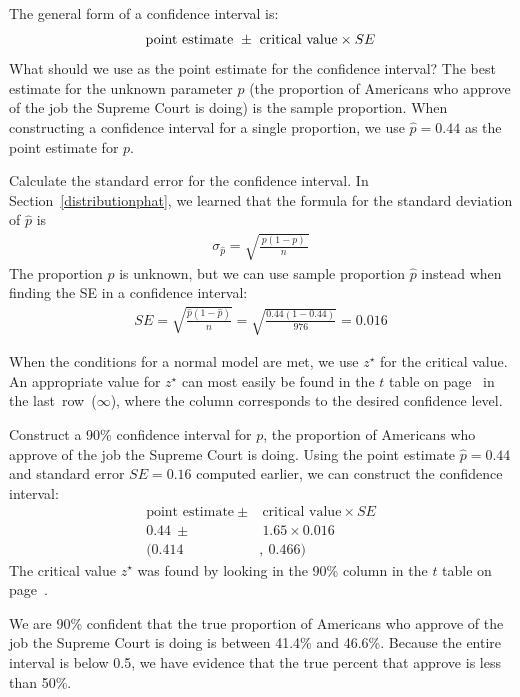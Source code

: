 \begin{example}{The general form of a confidence interval is:
\begin{align*}
\text{point estimate}\ \pm\ \text{critical value} \times SE\vspace{-2mm}
\end{align*}
What should we use as the point estimate for the confidence interval?}
\label{supremeCourtCISEExample}
The best estimate for the unknown parameter $p$ (the proportion of Americans who approve of the job the Supreme Court is doing) is the sample proportion. When constructing a confidence interval for a single proportion, we use $\hat{p} = 0.44$ as the point estimate for $p$.
\end{example}

\begin{example}{Calculate the standard error for the confidence interval.}
\label{supremeCourtCIFinishedExample}
In Section~\ref{distributionphat}, we learned that the formula for the standard deviation of $\hat{p}$ is
\begin{align*}
\sigma_{\hat{p}} = \sqrt{\frac{\ p(1-p)\ }{n}}
\end{align*}
The proportion $p$ is unknown, but we can use sample proportion $\hat{p}$ instead when finding the SE in a confidence interval:
\begin{align*}
SE = \sqrt{\frac{\hat{p}(1-\hat{p})}{n}}= \sqrt{\frac{0.44(1-0.44)}{976}}= 0.016
\end{align*}
\end{example}

When the conditions for a normal model are met, we use $z^\star$ for the critical value. An appropriate value for $z^\star$ can most easily be found in the $t$ table on page~\pageref{tDistributionTable} in the last~row~($\infty$), where the column corresponds to the desired confidence level.

\begin{example}{Construct a 90\% confidence interval for $p$, the proportion of Americans who approve of the job the Supreme Court is doing.}\label{90CIForJobSupremeCourtDoingExample}
Using the point estimate $\hat{p} = 0.44$ and standard error $SE = 0.16$ computed earlier, we can construct the confidence interval:
\begin{align*}
\text{point estimate}\ \pm&\  \text{critical value} \times SE \\
0.44\ \pm&\  1.65 \times 0.016 \\
(0.414&,\ 0.466)
\end{align*}
The critical value $z^{\star}$ was found by looking in the 90\% column in the $t$ table on page~\pageref{tDistributionTable}.

We are 90\% confident that the true proportion of Americans who approve of the job the Supreme Court is doing is between 41.4\% and 46.6\%. Because the entire interval is below 0.5, we have evidence that the true percent that approve is less than 50\%.
\end{example}


